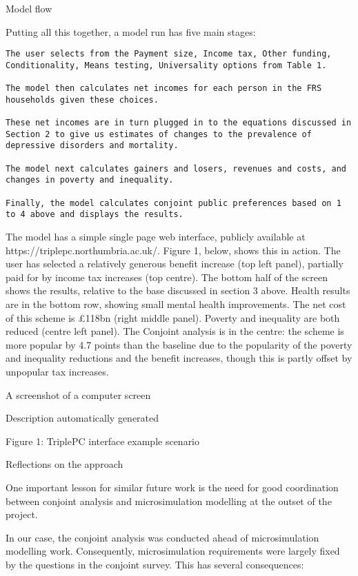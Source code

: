 \documentclass[
  letterpaper,
  DIV=11,
  numbers=noendperiod]{scrartcl}
\begin{document}
Model flow

Putting all this together, a model run has five main stages:

\begin{verbatim}
The user selects from the Payment size, Income tax, Other funding, Conditionality, Means testing, Universality options from Table 1. 

The model then calculates net incomes for each person in the FRS households given these choices. 

These net incomes are in turn plugged in to the equations discussed in Section 2 to give us estimates of changes to the prevalence of depressive disorders and mortality. 

The model next calculates gainers and losers, revenues and costs, and changes in poverty and inequality. 

Finally, the model calculates conjoint public preferences based on 1 to 4 above and displays the results. 
\end{verbatim}

The model has a simple single page web interface, publicly available at
https://triplepc.northumbria.ac.uk/. Figure 1, below, shows this in
action. The user has selected a relatively generous benefit increase
(top left panel), partially paid for by income tax increases (top
centre). The bottom half of the screen shows the results, relative to
the base discussed in section 3 above. Health results are in the bottom
row, showing small mental health improvements. The net cost of this
scheme is £118bn (right middle panel). Poverty and inequality are both
reduced (centre left panel). The Conjoint analysis is in the centre: the
scheme is more popular by 4.7 points than the baseline due to the
popularity of the poverty and inequality reductions and the benefit
increases, though this is partly offset by unpopular tax increases.

A screenshot of a computer screen

Description automatically generated

Figure 1: TriplePC interface example scenario

Reflections on the approach

One important lesson for similar future work is the need for good
coordination between conjoint analysis and microsimulation modelling at
the outset of the project.

In our case, the conjoint analysis was conducted ahead of
microsimulation modelling work. Consequently, microsimulation
requirements were largely fixed by the questions in the conjoint survey.
This has several consequences:
\end{document}
